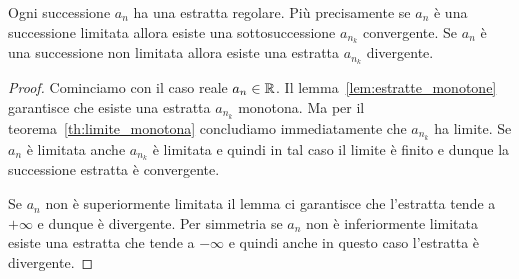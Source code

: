 \begin{theorem}\label{th:Bolzano}
\label{th:bolzano_weierstrass}%
\mymark{***}%
%
%
%
Ogni successione $a_n$ ha una estratta regolare.
Più precisamente se $a_n$ è una successione limitata
allora esiste una sottosuccessione
$a_{n_k}$ convergente.
Se $a_n$ è una successione non limitata allora 
esiste una estratta $a_{n_k}$ divergente.
\end{theorem}
%
\begin{proof}
\mymark{***}
Cominciamo con il caso reale $a_n\in {\mathbb R}$.
Il lemma~\ref{lem:estratte_monotone} garantisce 
che esiste una estratta $a_{n_k}$ monotona. 
Ma per il teorema~\ref{th:limite_monotona} concludiamo 
immediatamente che $a_{n_k}$ ha limite.
Se $a_n$ è limitata anche $a_{n_k}$ è limitata e quindi 
in tal caso il limite è finito e dunque la successione 
estratta è convergente.

Se $a_n$ non è superiormente limitata il lemma 
ci garantisce che l'estratta tende a $+\infty$ 
e dunque è divergente.
Per simmetria se $a_n$ non è inferiormente limitata 
esiste una estratta che tende a $-\infty$ e quindi anche in
questo caso l'estratta è divergente.

\begin{comment} %
Facciamo dapprima il caso $a_n\in \RR$.
\mymark{***}
Sia $A_0=\inf a_n$ e $B_0=\sup a_n$. Essendo $a_n$ limitata
sia $A_0$
che $B_0$ sono finiti e ogni termine della successione sta
nell'intervallo $[A_0,B_0]$. Definiamo $n_0=0$: ovviamente si avrà $a_{n_0} = a_0 \in [A_0, B_0]$.

Consideriamo il punto medio $M_0 = (A_0+B_0)/2$ dell'intervallo $[A_0,B_0]$ e consideriamo i due mezzi intervalli $[A_0,M_0]$ e $[M_0,B_0]$. Tutti i termini della successione stanno in almeno
uno di questi due intervalli.
Se consideriamo gli indici $n\in \NN$ della successione $a_n$, uno dei due sotto-intervalli deve contenere termini
della successione per infiniti indici.
Chiamiamo $[A_1, B_1]$
tale sottointervallo,
chiamiamo $n_1$ il più piccolo naturale maggiore di $n_0=0$
per cui $a_{n_1} \in [A_1,  B_1]$.

Ripetiamo il procedimento.
Consideriamo il punto medio $M_1$ dell'intervallo $[A_1,B_1]$.
Per costruzione l'intervallo contiene termini della successione
per infiniti indici dunque uno dei due sotto-intervalli $[A_1,M_1]$
o $[M_1,B_1]$ deve anche lui
contenere termini della successione per infiniti indici. Chiamiamo
$[A_2, B_2]$ tale intervallo e definiamo $n_2$ come il più piccolo
naturale maggiore di $n_1$ per cui $a_{n_2}\in [A_2, B_2]$.


\end{comment}
\end{proof}
